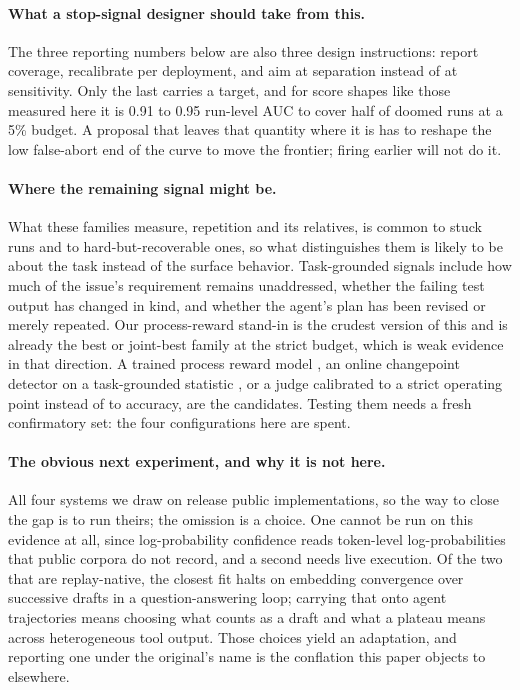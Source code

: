 \documentclass[sigconf,screen]{acmart}
\begin{document}
\paragraph{What a stop-signal designer should take from this.} The three reporting numbers below are
also three design instructions: report coverage, recalibrate per deployment, and aim at separation
instead of at sensitivity. Only the last carries a target, and for score shapes like those measured
here it is 0.91 to 0.95 run-level AUC to cover half of doomed runs at a 5\% budget. A proposal
that leaves that quantity where it is has to reshape the low false-abort end of the curve to move
the frontier; firing earlier will not do it.

\paragraph{Where the remaining signal might be.} What these families measure, repetition and its
relatives, is common to stuck runs and to hard-but-recoverable ones, so what distinguishes them is
likely to be about the task instead of the surface behavior. Task-grounded signals include how
much of the issue's requirement remains unaddressed, whether the failing test output has changed
in kind, and whether the agent's plan has been revised or merely repeated. Our process-reward stand-in is the crudest version of this and
is already the best or joint-best family at the strict budget, which is weak evidence in that
direction. A trained process reward model \cite{lightman2023verify}, an online changepoint detector
on a task-grounded statistic \cite{adams2007bayesian}, or a judge calibrated to a strict operating
point instead of to accuracy, are the candidates. Testing them needs a fresh confirmatory set: the
four configurations here are spent.

\paragraph{The obvious next experiment, and why it is not here.} All four systems we draw on release
public implementations, so the way to close the gap is to run theirs; the omission is a choice. One
cannot be run on this evidence at all, since log-probability confidence \cite{agentstop2026} reads
token-level log-probabilities that public corpora do not record, and a second needs live execution.
Of the two that are replay-native, the closest fit halts on embedding convergence over successive
drafts in a question-answering loop; carrying that onto agent trajectories means choosing
what counts as a draft and what a plateau means across heterogeneous tool output. Those choices
yield an adaptation, and reporting one under the original's name is the conflation this paper
objects to elsewhere.
\end{document}
